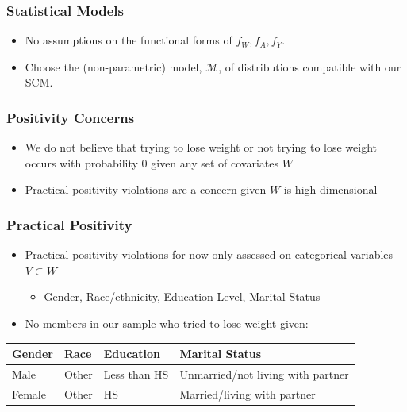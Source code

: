 \documentclass{beamer}
\newcommand{\M}{\mathcal{M}}
\begin{document}
\begin{frame}
 \frametitle{Statistical Models}
 \begin{itemize}
  \item No assumptions on the functional forms of $f_W, f_A, f_Y$.
  \item Choose the (non-parametric) model, $\M$, of distributions compatible with our SCM.
 \end{itemize}
\end{frame}

\begin{frame}
\frametitle{Positivity Concerns}
\begin{itemize}
 \item We do not believe that trying to lose weight or not trying to lose weight occurs with probability $0$ given any set of  covariates $W$
 \item Practical positivity violations are a concern given $W$ is high dimensional
\end{itemize}
\end{frame}

\begin{frame}
\frametitle{Practical Positivity}
\begin{itemize}
 \item Practical positivity violations for now only assessed on categorical variables $V\subset W$
 \begin{itemize}
  \item Gender, Race/ethnicity, Education Level, Marital Status
 \end{itemize}
 \item No members in our sample who tried to lose weight given:
\end{itemize}
\begin{tabular}{| l | l | l | l |}
\hline
 Gender & Race & Education & Marital Status \\
\hline
Male & Other & Less than HS & Unmarried/not living with partner \\
Female & Other & HS & Married/living with partner \\
\hline
\end{tabular}
\end{frame}
\end{document}

